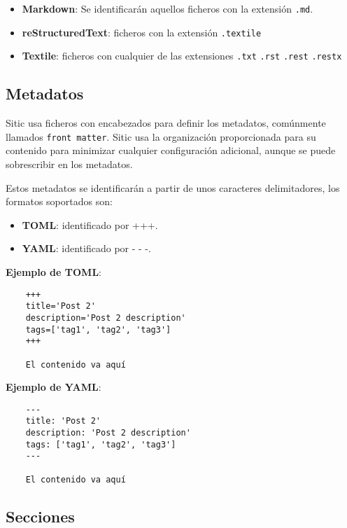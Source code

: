 \begin{itemize}
    \item \textbf{Markdown}: Se identificarán aquellos ficheros con la extensión \texttt{.md}.
    \item \textbf{reStructuredText}: ficheros con la extensión \texttt{.textile}
    \item \textbf{Textile}: ficheros con cualquier de las extensiones \texttt{.txt} \texttt{.rst} \texttt{.rest} \texttt{.restx}
\end{itemize}

\subsection{Metadatos}

Sitic usa ficheros con encabezados para definir los metadatos, comúnmente llamados \texttt{front matter}.
Sitic usa la organización proporcionada para su contenido para minimizar cualquier
configuración adicional, aunque se puede sobrescribir en los metadatos.

Estos metadatos se identificarán a partir de unos caracteres delimitadores, los formatos soportados son:

\begin{itemize}
    \item \textbf{TOML}: identificado por +++.
    \item \textbf{YAML}: identificado por - - -.
\end{itemize}

\textbf{Ejemplo de TOML}:

\begin{verbatim}
    +++
    title='Post 2'
    description='Post 2 description'
    tags=['tag1', 'tag2', 'tag3']
    +++

    El contenido va aquí
\end{verbatim}

\textbf{Ejemplo de YAML}:

\begin{verbatim}
    ---
    title: 'Post 2'
    description: 'Post 2 description'
    tags: ['tag1', 'tag2', 'tag3']
    ---

    El contenido va aquí
\end{verbatim}


\subsection{Secciones}

